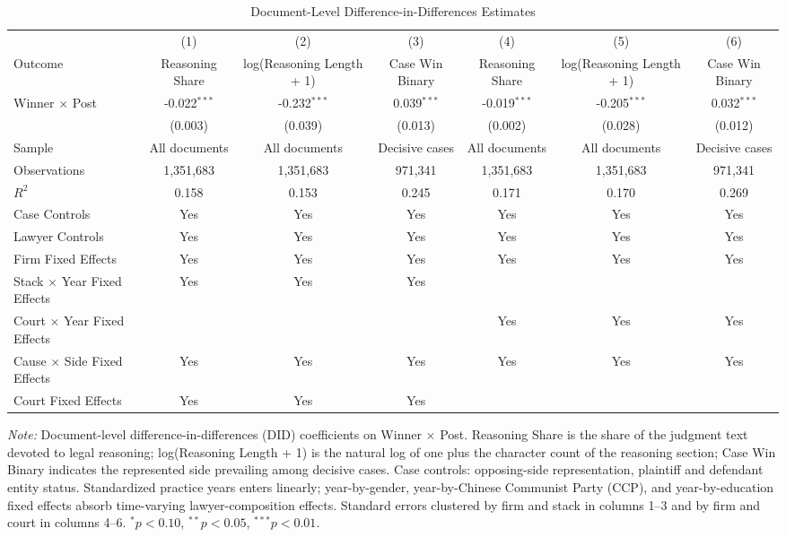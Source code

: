 \begin{table}[!htbp]
\setlength{\abovecaptionskip}{0pt}
\centering
\caption{Document-Level Difference-in-Differences Estimates}
\label{tab:document_level_did_main}
\begin{threeparttable}
\begin{tabular}{lcccccc}
\toprule
 & (1) & (2) & (3) & (4) & (5) & (6) \\
Outcome & Reasoning Share & log(Reasoning Length + 1) & Case Win Binary & Reasoning Share & log(Reasoning Length + 1) & Case Win Binary \\
\midrule
Winner $\times$ Post & -0.022$^{***}$ & -0.232$^{***}$ & 0.039$^{***}$ & -0.019$^{***}$ & -0.205$^{***}$ & 0.032$^{***}$ \\
& (0.003) & (0.039) & (0.013) & (0.002) & (0.028) & (0.012) \\
\addlinespace
Sample & All documents & All documents & Decisive cases & All documents & All documents & Decisive cases \\
Observations & 1,351,683 & 1,351,683 & 971,341 & 1,351,683 & 1,351,683 & 971,341 \\
$R^2$ & 0.158 & 0.153 & 0.245 & 0.171 & 0.170 & 0.269 \\
Case Controls & Yes & Yes & Yes & Yes & Yes & Yes \\
Lawyer Controls & Yes & Yes & Yes & Yes & Yes & Yes \\
Firm Fixed Effects & Yes & Yes & Yes & Yes & Yes & Yes \\
Stack $\times$ Year Fixed Effects & Yes & Yes & Yes &  &  &  \\
Court $\times$ Year Fixed Effects &  &  &  & Yes & Yes & Yes \\
Cause $\times$ Side Fixed Effects & Yes & Yes & Yes & Yes & Yes & Yes \\
Court Fixed Effects & Yes & Yes & Yes &  &  &  \\
\bottomrule
\end{tabular}
\begin{tablenotes}[flushleft]
\footnotesize
\item \textit{Note:} Document-level difference-in-differences (DID) coefficients on Winner $\times$ Post. Reasoning Share is the share of the judgment text devoted to legal reasoning; log(Reasoning Length + 1) is the natural log of one plus the character count of the reasoning section; Case Win Binary indicates the represented side prevailing among decisive cases. Case controls: opposing-side representation, plaintiff and defendant entity status. Standardized practice years enters linearly; year-by-gender, year-by-Chinese Communist Party (CCP), and year-by-education fixed effects absorb time-varying lawyer-composition effects. Standard errors clustered by firm and stack in columns 1--3 and by firm and court in columns 4--6. $^{*}p<0.10$, $^{**}p<0.05$, $^{***}p<0.01$.
\end{tablenotes}
\end{threeparttable}
\end{table}
